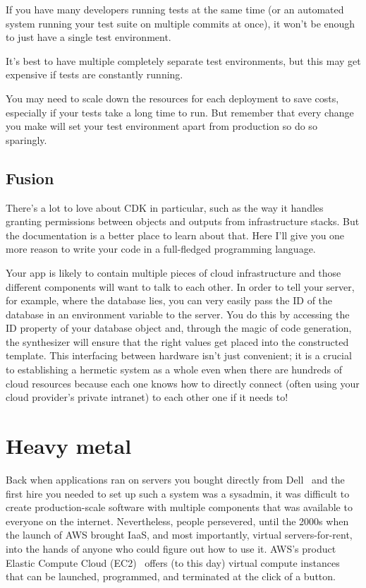 \documentclass{article}
\newcommand{\infobox}[2]{
  \begin{tcolorbox}[width=\textwidth,colback={white},title={\strut\textbf{#1}},colbacktitle=blue!15,coltitle=black,boxrule=0.2pt,parbox=false]
    #2
  \end{tcolorbox}
}
\begin{document}
\infobox{More on remote tests}{
  If you have many developers running tests at the same time (or an automated system running your test suite on multiple commits at once), it won't be enough to just have a single test environment.

  It's best to have multiple completely separate test environments, but this may get expensive if tests are constantly running.

  You may need to scale down the resources for each deployment to save costs, especially if your tests take a long time to run.
  But remember that every change you make will set your test environment apart from production so do so sparingly.
}

\subsection{Fusion}

There's a lot to love about CDK in particular, such as the way it handles granting permissions between objects and outputs from infrastructure stacks.
But the documentation is a better place to learn about that.
Here I'll give you one more reason to write your code in a full-fledged programming language.

Your app is likely to contain multiple pieces of cloud infrastructure and those different components will want to talk to each other.
In order to tell your server, for example, where the database lies, you can very easily pass the ID of the database in an environment variable to the server.
You do this by accessing the ID property of your database object and, through the magic of code generation, the synthesizer will ensure that the right values get placed into the constructed template.
This interfacing between hardware isn't just convenient; it is a crucial to establishing a hermetic system as a whole even when there are hundreds of cloud resources because each one knows how to directly connect (often using your cloud provider's private intranet) to each other one if it needs to!

\section{Heavy metal}

Back when applications ran on servers you bought directly from Dell~\cite{joel-dell} and the first hire you needed to set up such a system was a sysadmin, it was difficult to create production-scale software with multiple components that was available to everyone on the internet.
Nevertheless, people persevered, until the 2000s when the launch of AWS brought IaaS, and most importantly, virtual servers-for-rent, into the hands of anyone who could figure out how to use it.
AWS's product Elastic Compute Cloud (EC2)~\cite{ec2} offers (to this day) virtual compute instances that can be launched, programmed, and terminated at the click of a button.
\end{document}
